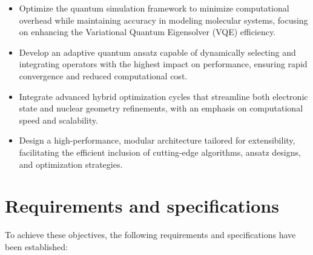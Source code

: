 \begin{itemize}
  \item Optimize the quantum simulation framework to minimize computational overhead while maintaining accuracy in modeling molecular systems, focusing on enhancing the Variational Quantum Eigensolver (VQE) efficiency.
  \item Develop an adaptive quantum ansatz capable of dynamically selecting and integrating operators with the highest impact on performance, ensuring rapid convergence and reduced computational cost.
  \item Integrate advanced hybrid optimization cycles that streamline both electronic state and nuclear geometry refinements, with an emphasis on computational speed and scalability.
  \item Design a high-performance, modular architecture tailored for extensibility, facilitating the efficient inclusion of cutting-edge algorithms, ansatz designs, and optimization strategies.
\end{itemize}


\section{Requirements and specifications}

To achieve these objectives, the following requirements and specifications have been established:

